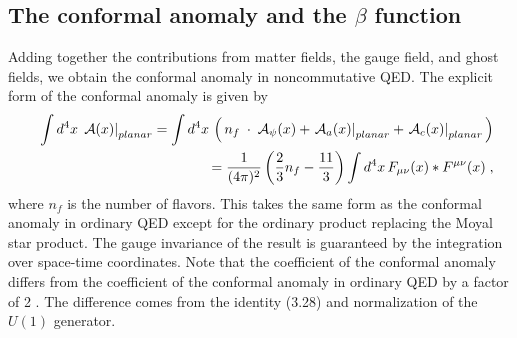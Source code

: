 \documentclass[a4paper,12pt]{article}
\begin{document}
%
\setcounter{subsection}{2}
\subsection{The conformal anomaly and the $\beta$ function}
%


Adding together the contributions from matter fields, the gauge field, and 
ghost fields, we obtain the conformal anomaly in noncommutative QED. The 
explicit form of the conformal anomaly is given by 
%
\begin{eqnarray}
& & \int d^{4}x \, \left. {\cal A}(x) \right|_{planar} 
= \int d^{4}x \, \left( \,  n_{f} \;\cdot\;{\cal A}_{\psi}(x) 
+ \left. {\cal A}_{a}(x) \right|_{planar} 
+ \left. {\cal A}_{c}(x) \right|_{planar} \, \right) \nonumber \\
& & = \frac{1}{(4\pi)^{2}}  \left( \frac{2}{3}n_{f} - \frac{11}{3} \right) 
\int d^{4}x \, F_{\mu\nu}(x) \ast F^{\mu\nu}(x) \;,
\end{eqnarray}
%
where $n_{f}$ is the number of flavors. This takes the same form as 
the conformal anomaly in ordinary QED except for the ordinary product replacing the Moyal star product. 
The gauge invariance of the result is guaranteed by 
the integration over space-time coordinates. Note that the coefficient of 
the conformal anomaly differs from the coefficient of the conformal 
anomaly in ordinary QED by a factor of 2 \cite{KF}. The difference 
comes from the identity (3.28) and normalization of the $U(1)$ generator. 
\end{document}
